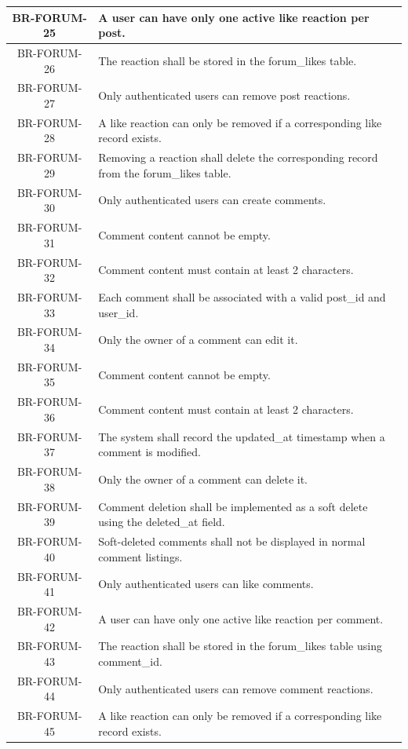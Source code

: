 \begin{longtable}{|c|p{12cm}|}
    BR-FORUM-25 & A user can have only one active like reaction per post. \\ \hline
    BR-FORUM-26 & The reaction shall be stored in the forum\_likes table. \\ \hline
    BR-FORUM-27 & Only authenticated users can remove post reactions. \\ \hline
    BR-FORUM-28 & A like reaction can only be removed if a corresponding like record exists. \\ \hline
    BR-FORUM-29 & Removing a reaction shall delete the corresponding record from the forum\_likes table. \\ \hline
    BR-FORUM-30 & Only authenticated users can create comments. \\ \hline
    BR-FORUM-31 & Comment content cannot be empty. \\ \hline
    BR-FORUM-32 & Comment content must contain at least 2 characters. \\ \hline
    BR-FORUM-33 & Each comment shall be associated with a valid post\_id and user\_id. \\ \hline
    BR-FORUM-34 & Only the owner of a comment can edit it. \\ \hline
    BR-FORUM-35 & Comment content cannot be empty. \\ \hline
    BR-FORUM-36 & Comment content must contain at least 2 characters. \\ \hline
    BR-FORUM-37 & The system shall record the updated\_at timestamp when a comment is modified. \\ \hline
    BR-FORUM-38 & Only the owner of a comment can delete it. \\ \hline
    BR-FORUM-39 & Comment deletion shall be implemented as a soft delete using the deleted\_at field. \\ \hline
    BR-FORUM-40 & Soft-deleted comments shall not be displayed in normal comment listings. \\ \hline
    BR-FORUM-41 & Only authenticated users can like comments. \\ \hline
    BR-FORUM-42 & A user can have only one active like reaction per comment. \\ \hline
    BR-FORUM-43 & The reaction shall be stored in the forum\_likes table using comment\_id. \\ \hline
    BR-FORUM-44 & Only authenticated users can remove comment reactions. \\ \hline
    BR-FORUM-45 & A like reaction can only be removed if a corresponding like record exists. \\ \hline

\end{longtable}
